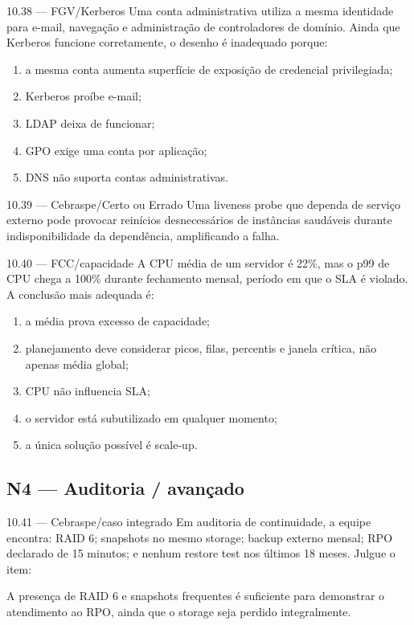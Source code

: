 \begin{questao}{ 10.38 — FGV/Kerberos}
Uma conta administrativa utiliza a mesma identidade para e-mail, navegação e administração de controladores de domínio. Ainda que Kerberos funcione corretamente, o desenho é inadequado porque:
\begin{enumerate}[label=\Alph*)]
\item a mesma conta aumenta superfície de exposição de credencial privilegiada;
\item Kerberos proíbe e-mail;
\item LDAP deixa de funcionar;
\item GPO exige uma conta por aplicação;
\item DNS não suporta contas administrativas.
\end{enumerate}
\end{questao}

\begin{questao}{ 10.39 — Cebraspe/Certo ou Errado}
Uma liveness probe que dependa de serviço externo pode provocar reinícios desnecessários de instâncias saudáveis durante indisponibilidade da dependência, amplificando a falha.
\end{questao}

\begin{questao}{ 10.40 — FCC/capacidade}
A CPU média de um servidor é 22\%, mas o p99 de CPU chega a 100\% durante fechamento mensal, período em que o SLA é violado. A conclusão mais adequada é:
\begin{enumerate}[label=\Alph*)]
\item a média prova excesso de capacidade;
\item planejamento deve considerar picos, filas, percentis e janela crítica, não apenas média global;
\item CPU não influencia SLA;
\item o servidor está subutilizado em qualquer momento;
\item a única solução possível é scale-up.
\end{enumerate}
\end{questao}

\subsection*{N4 — Auditoria / avançado}

\begin{questao}{ 10.41 — Cebraspe/caso integrado}
Em auditoria de continuidade, a equipe encontra: RAID 6; snapshots no mesmo storage; backup externo mensal; RPO declarado de 15 minutos; e nenhum restore test nos últimos 18 meses. Julgue o item:

A presença de RAID 6 e snapshots frequentes é suficiente para demonstrar o atendimento ao RPO, ainda que o storage seja perdido integralmente.
\end{questao}

